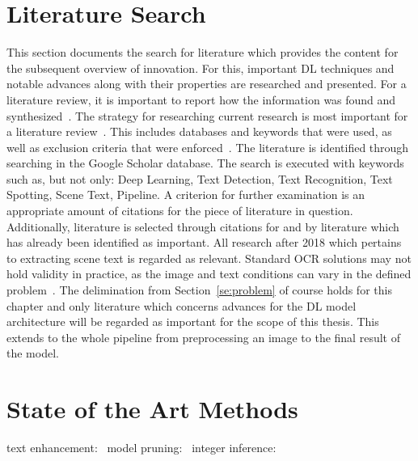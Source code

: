\section{Literature Search}\label{se:litSearch}
This section documents the search for literature which provides the content for the subsequent
overview of innovation.
For this, important \ac{DL} techniques and notable advances along with their properties are researched
and presented.
For a literature review, it is important to report how the information was found and
synthesized~\citep{torraco_writing_2005}.
The strategy for researching current research is most important for a literature
review~\citep{snyder_literature_2019}.
This includes databases and keywords that were used, as well as exclusion criteria that were
enforced~\citep{torraco_writing_2005}.
The literature is identified through searching in the Google Scholar database.
The search is executed with keywords such as, but not only: Deep Learning, Text Detection,
Text Recognition, Text Spotting, Scene Text, Pipeline.
A criterion for further examination is an appropriate amount of citations for the piece of literature
in question.
Additionally, literature is selected through citations for and by literature which has already been
identified as important.
All research after 2018 which pertains to extracting scene text is regarded as relevant.
Standard \ac{OCR} solutions may not hold validity in practice, as the image and text conditions can
vary in the defined problem~\citep{chen_text_2021}.
The delimination from Section~\ref{se:problem} of course holds for this chapter and only literature
which concerns advances for the \ac{DL} model architecture will be regarded as important for the
scope of this thesis.
This extends to the whole pipeline from preprocessing an image to the final result of the model.



\section{State of the Art Methods}

text enhancement:~\cite{chen_text_2021}
model pruning:~\cite{niu_26ms_2019}
integer inference:~\cite{ignatov_ai_2019}
